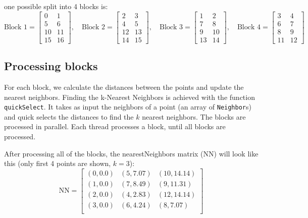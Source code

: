 \documentclass{article}
\begin{document}
one possible split into 4 blocks is:
\[
\text{Block 1} = \begin{bmatrix}
0 & 1 \\
5 & 6 \\
10 & 11 \\
15 & 16
\end{bmatrix}, \quad
\text{Block 2} = \begin{bmatrix}
2 & 3 \\
4 & 5 \\
12 & 13 \\
14 & 15
\end{bmatrix}, \quad
\text{Block 3} = \begin{bmatrix}
1 & 2 \\
7 & 8 \\
9 & 10 \\
13 & 14
\end{bmatrix}, \quad
\text{Block 4} = \begin{bmatrix}
3 & 4 \\
6 & 7 \\
8 & 9 \\
11 & 12
\end{bmatrix}
\]

\subsection{Processing blocks}
For each block, we calculate the distances between the points and update the nearest neighbors.
Finding the k-Nearest Neighbors is achieved with the function \texttt{quickSelect}. It takes as input
the neighbors of a point (an array of \texttt{Neighbor}s) and quick selects the distances to find the $k$ nearest neighbors.
The blocks are processed in parallel. Each thread processes a block, until all blocks are processed.

After processing all of the blocks, the nearestNeighbors matrix (NN) will look like this (only first 4 points are shown, $k=3$):
\[
\text{NN} = \begin{bmatrix}
(0, 0.0) & (5, 7.07) & (10, 14.14) \\
(1, 0.0) & (7, 8.49) & (9, 11.31) \\
(2, 0.0) & (4, 2.83) & (12, 14.14) \\
(3, 0.0) & (6, 4.24) & (8, 7.07) \\
\end{bmatrix}
\]
\end{document}

